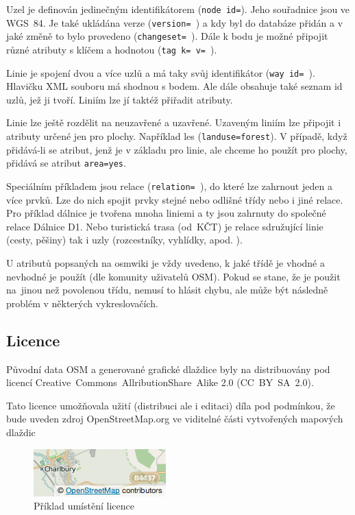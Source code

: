 Uzel je definován jedinečným identifikátorem ({\tt node id=}). Jeho 
souřadnice jsou ve WGS~­84. Je také ukládána verze ({\tt version= }) a kdy 
byl do databáze přidán a v jaké změně to bylo provedeno ({\tt changeset=~}). 
Dále k bodu je možné připojit různé atributy s klíčem a hodnotou ({\tt tag~k=~v=~}). 

Linie je spojení dvou a více uzlů a má taky svůj identifikátor ({\tt way~id=~}).
Hlavičku XML souboru má shodnou s bodem. Ale dále obsahuje také seznam id uzlů, 
jež ji tvoří. Liniím lze jí taktéž přiřadit atributy.  

Linie lze ještě rozdělit na neuzavřené a uzavřené. Uzaveným liniím lze připojit 
i atributy určené jen pro plochy. Například les ({\tt landuse=forest}).
V případě, když přidává-li se atribut, jenž je v základu pro linie, ale chceme
ho použít pro plochy, přidává se atribut {\tt area=yes}.

Speciálním příkladem jsou relace ({\tt relation= }), do které lze zahrnout 
jeden a více prvků. Lze do nich spojit prvky stejné nebo odlišné třídy 
nebo i jiné relace. Pro příklad dálnice je tvořena mnoha liniemi a ty 
jsou zahrnuty do společné relace Dálnice D1. Nebo turistická trasa 
(od~KČT) je relace sdružující linie (cesty, pěšiny) tak i uzly 
(rozcestníky, vyhlídky, apod. ).

U atributů popsaných na osmwiki je vždy uvedeno, k jaké třídě je 
vhodné a nevhodné je použít (dle komunity uživatelů OSM). Pokud se stane, že je použit 
na~jinou než povolenou třídu, nemusí to hlásit chybu, ale může být následně 
problém v některých vykreslovačích. \cite{OSMfeatures}

\subsection{Licence}
\label{licence}

Původní data OSM a generované grafické dlaždice
byly na distribuovány pod licencí
Creative~Commons~Allribution­Share~Alike 2.0 (CC~BY~­SA~2.0). 

Tato licence umožňovala užití (distribuci ale i editaci) díla pod podmínkou, 
že bude uveden zdroj OpenStreetMap.org ve viditelné části 
vytvořených mapových dlaždic \cite{OSMlicence} 

  \begin{figure}[hbt]
    \centering
      \includegraphics{./pictures/attribution_example.png}
      \caption{Příklad umístění licence}
      \label{fig:attribution_example}
  \end{figure} 

